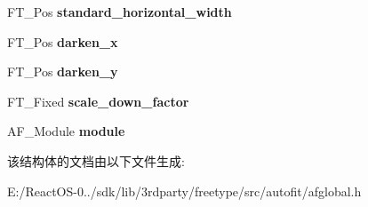 \begin{DoxyCompactItemize}
\item 
\mbox{\label{struct_a_f___face_globals_rec___a517ff85adb5c8aa7a38ada5b98edbb91}} 
F\+T\+\_\+\+Pos {\bfseries standard\+\_\+horizontal\+\_\+width}
\item 
\mbox{\label{struct_a_f___face_globals_rec___aace2413d433550041a831a160e9d9c91}} 
F\+T\+\_\+\+Pos {\bfseries darken\+\_\+x}
\item 
\mbox{\label{struct_a_f___face_globals_rec___a6dc96d5414793f9f9dcfec6f7b3f6a6d}} 
F\+T\+\_\+\+Pos {\bfseries darken\+\_\+y}
\item 
\mbox{\label{struct_a_f___face_globals_rec___aba4667e1f9504152370887c5fa2a9dea}} 
F\+T\+\_\+\+Fixed {\bfseries scale\+\_\+down\+\_\+factor}
\item 
\mbox{\label{struct_a_f___face_globals_rec___a30887578f18b663c4dfa0309221a8043}} 
A\+F\+\_\+\+Module {\bfseries module}
\end{DoxyCompactItemize}


该结构体的文档由以下文件生成\+:\begin{DoxyCompactItemize}
\item 
E\+:/\+React\+O\+S-\/0../sdk/lib/3rdparty/freetype/src/autofit/afglobal.\+h\end{DoxyCompactItemize}
